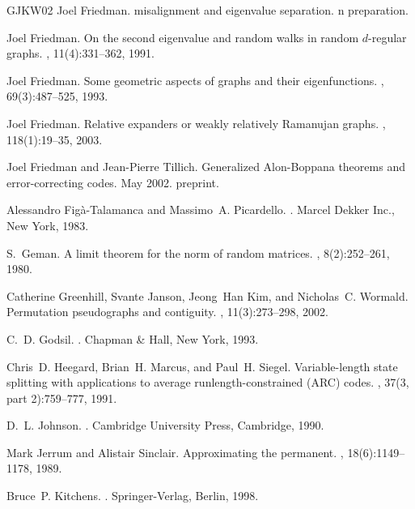 \documentclass[12pt]{article}
\begin{document}
\begin{thebibliography}{GJKW02}
Joel Friedman.
 misalignment and eigenvalue separation.
n preparation.

Joel Friedman.
\newblock On the second eigenvalue and random walks in random $d$-regular
  graphs.
, 11(4):331--362, 1991.

Joel Friedman.
\newblock Some geometric aspects of graphs and their eigenfunctions.
, 69(3):487--525, 1993.

Joel Friedman.
\newblock Relative expanders or weakly relatively {R}amanujan graphs.
, 118(1):19--35, 2003.

Joel Friedman and Jean-Pierre Tillich.
\newblock Generalized {A}lon-{B}oppana theorems and error-correcting codes.
\newblock May 2002.
\newblock preprint.

Alessandro Fig{\`a}-Talamanca and Massimo~A. Picardello.
.
\newblock Marcel Dekker Inc., New York, 1983.

S.~Geman.
\newblock A limit theorem for the norm of random matrices.
, 8(2):252--261, 1980.

Catherine Greenhill, Svante Janson, Jeong~Han Kim, and Nicholas~C. Wormald.
\newblock Permutation pseudographs and contiguity.
, 11(3):273--298, 2002.

C.~D. Godsil.
.
\newblock Chapman \& Hall, New York, 1993.

Chris~D. Heegard, Brian~H. Marcus, and Paul~H. Siegel.
\newblock Variable-length state splitting with applications to average
  runlength-constrained ({ARC}) codes.
, 37(3, part 2):759--777, 1991.

D.~L. Johnson.
.
\newblock Cambridge University Press, Cambridge, 1990.

Mark Jerrum and Alistair Sinclair.
\newblock Approximating the permanent.
, 18(6):1149--1178, 1989.

Bruce~P. Kitchens.
.
\newblock Springer-Verlag, Berlin, 1998.


\end{thebibliography}
\end{document}
